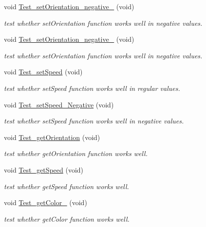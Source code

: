 \begin{DoxyCompactItemize}
void \hyperlink{classObjectTests_aad4c222661558640bb487a7880b5a326}{Test\-\_\-set\-Orientation\-\_\-negative\-\_} (void)
\begin{DoxyCompactList}\small\item\em test whether set\-Orientation function works well in negative values. \end{DoxyCompactList}\item 
void \hyperlink{classObjectTests_a82f42fddbe68538ca457961382109889}{Test\-\_\-set\-Orientation\-\_\-negative\-\_} (void)
\begin{DoxyCompactList}\small\item\em test whether set\-Orientation function works well in negative values. \end{DoxyCompactList}\item 
void \hyperlink{classObjectTests_a7bac3f755703531183355993f8c880cc}{Test\-\_\-set\-Speed} (void)
\begin{DoxyCompactList}\small\item\em test whether set\-Speed function works well in regular values. \end{DoxyCompactList}\item 
void \hyperlink{classObjectTests_a2cf438a435380b1258587c55d652ffc3}{Test\-\_\-set\-Speed\-\_\-\-Negative} (void)
\begin{DoxyCompactList}\small\item\em test whether set\-Speed function works well in negative values. \end{DoxyCompactList}\item 
void \hyperlink{classObjectTests_ae3c9867ca18bf9fa6afa9f92ab4fbac3}{Test\-\_\-get\-Orientation} (void)
\begin{DoxyCompactList}\small\item\em test whether get\-Orientation function works well. \end{DoxyCompactList}\item 
void \hyperlink{classObjectTests_ade778461cf9a7dd289768f151303b956}{Test\-\_\-get\-Speed} (void)
\begin{DoxyCompactList}\small\item\em test whether get\-Speed function works well. \end{DoxyCompactList}\item 
void \hyperlink{classObjectTests_a46b29ddba05b7349987bad6f9c9b4147}{Test\-\_\-get\-Color\-\_} (void)
\begin{DoxyCompactList}\small\item\em test whether get\-Color function works well. \end{DoxyCompactList}\item 

\end{DoxyCompactItemize}
